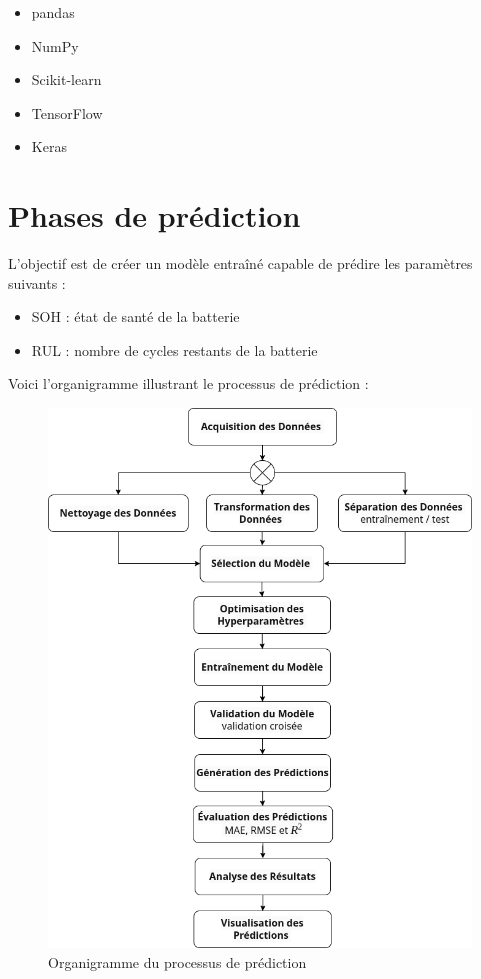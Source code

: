 \begin{itemize} 
	\item pandas 
	\item NumPy 
	\item Scikit-learn 
	\item TensorFlow 
	\item Keras 
\end{itemize}

\section{Phases de prédiction}

L'objectif est de créer un modèle entraîné capable de prédire les paramètres suivants : 
\begin{itemize} 
	\item SOH : état de santé de la batterie 
	\item RUL : nombre de cycles restants de la batterie \end{itemize}

Voici l'organigramme illustrant le processus de prédiction : 


\begin{figure}[H]
	\centering
	\includegraphics[width=12cm]{./img/processus.png}
	\caption{Organigramme du processus de prédiction}

\end{figure}


